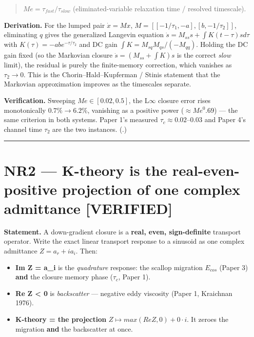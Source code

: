 \documentclass[11pt]{article}
\newcommand{\ctV}[1]{{\small\textbf{\textcolor{cVer}{[VERIFIED#1]}}}}
\begin{document}
\begin{quote}
$Me = \tau _{fast} / \tau _{slow}$   (eliminated-variable relaxation time / resolved timescale).
\end{quote}


\textbf{Derivation.} For the lumped pair $\dot{x} = M x$, $M=[[-1/\tau _{1},-a],[b,-1/\tau _{2}]]$, eliminating $q$ gives the generalized Langevin equation $\dot{s} = M_{ss} s + \int K(t-\tau )s d\tau $ with $K(\tau )=-ab e^{-\tau /\tau _{2}}$ and DC gain $\int K = M_{sq} M_{qs}/(-M_{qq})$. Holding the DC gain fixed (so the Markovian closure $\dot{s}=(M_{ss}+\int K)s$ is the correct \emph{slow} limit), the residual is purely the finite-memory correction, which vanishes as $\tau _{2}\to 0$. This is the Chorin–Hald–Kupferman / Stinis statement that the Markovian approximation improves as the timescales separate.


\textbf{Verification.} Sweeping $Me\in [0.02,0.5]$, the L\ensuremath{\infty} closure error rises monotonically $0.7\% \to  6.2\%$, vanishing as a positive power ($\approx Me^{0}.69$) — the same criterion in both systems. Paper 1's measured $\tau _{c}\approx 0.02–0.03$ and Paper 4's channel time $\tau _{2}$ are the two instances. (.)


\medskip\hrule\medskip


\section*{NR2 — K-theory is the real-even-positive projection of one complex admittance \ctV{}}


\textbf{Statement.} A down-gradient closure is a \textbf{real, even, sign-definite} transport operator. Write the exact linear transport response to a sinusoid as one complex admittance $Z = a_{r} + i a_{i}$. Then:


\begin{itemize}
\item \textbf{Im Z = a\_i} is the \emph{quadrature} response: the scallop migration $E_{cos}$ (Paper 3) \textbf{and} the closure memory phase ($\tau _{c}$, Paper 1).
\item \textbf{Re Z < 0} is \emph{backscatter} — negative eddy viscosity (Paper 1, Kraichnan 1976).
\item \textbf{K-theory = the projection} $Z \mapsto  max(Re Z, 0) + 0\cdot i$. It zeroes the migration \textbf{and} the backscatter at once.
\end{itemize}
\end{document}
